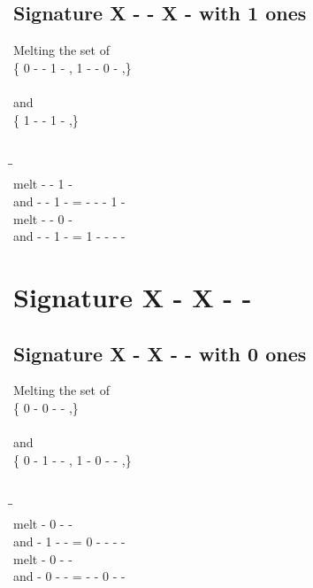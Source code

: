 \documentclass{article}
\begin{document}
\subsection{Signature X - - X - with 1 ones}
Melting the set of\\
\{ 0  -  -  1  - , 1  -  -  0  - ,\}\\\\
and\\
\{ 1  -  -  1  - ,\}\\\\
\begin{tabbing}
\hspace{3cm}\=\hspace{3cm}\=\hspace{3cm}\\[1cm]
melt  -  -  1  - \\
and  -  -  1  - \>
 =  -  -  -  1  - \\[1mm]
melt  -  -  0  - \\
and  -  -  1  - \>
 =  1  -  -  -  - \\[1mm]
\end{tabbing}
\newpage
\section{Signature X - X - - }
\subsection{Signature X - X - - with 0 ones}
Melting the set of\\
\{ 0  -  0  -  - ,\}\\\\
and\\
\{ 0  -  1  -  - , 1  -  0  -  - ,\}\\\\
\begin{tabbing}
\hspace{3cm}\=\hspace{3cm}\=\hspace{3cm}\\[1cm]
melt  -  0  -  - \\
and  -  1  -  - \>
 =  0  -  -  -  - \\[1mm]
melt  -  0  -  - \\
and  -  0  -  - \>
 =  -  -  0  -  - \\[1mm]
\end{tabbing}
\newpage
\end{document}
